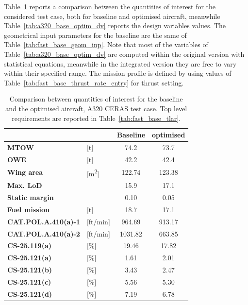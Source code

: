Table~\ref{tab:a320_base_optim_comparison} reports a comparison between the quantities of interest for the considered test case, both for baseline and optimised aircraft, meanwhile Table~\ref{tab:a320_base_optim_dv} reports the design variables values.
The geometrical input parameters for the baseline are the same of Table~\ref{tab:fast_base_geom_inp}.
Note that most of the variables of Table~\ref{tab:a320_base_optim_dv} are computed within the original version with statistical equations, meanwhile in the integrated version they are free to vary within their specified range.
The mission profile is defined by using values of Table~\ref{tab:fast_base_thrust_rate_entry} for thrust setting. 
\begin{table}[!h]
	\centering
	\begin{tabular}{l l c c}
		\hline
		& & \textbf{Baseline} & \textbf{optimised} \\
		\hline
		\textbf{MTOW} & [\si{\tonne}] & 74.2 & 73.7 \\
		\textbf{OWE} & [\si{\tonne}] & 42.2 & 42.4 \\
		\textbf{Wing area} & [\si{\square\meter}] & 122.74 & 123.38 \\
		\textbf{Max. LoD} & & 15.9 & 17.1 \\
		\textbf{Static margin} & & 0.10 & 0.05 \\
		\textbf{Fuel mission} & [\si{\tonne}] & 18.7 & 17.1 \\
		\hline
		\textbf{CAT.POL.A.410(a)-1} & [ft/min] & 964.69 & 913.17 \\
		\textbf{CAT.POL.A.410(a)-2} & [ft/min] & 1031.82 & 663.85 \\
		\textbf{CS-25.119(a)} & [\%] & 19.46 & 17.82 \\
		\textbf{CS-25.121(a)} & [\%] & 1.61 & 2.01 \\
		\textbf{CS-25.121(b)} & [\%] & 3.43 & 2.47 \\
		\textbf{CS-25.121(c)} & [\%] & 5.56 & 5.30 \\
		\textbf{CS-25.121(d)} & [\%] & 7.19 & 6.78 \\
		\hline
	\end{tabular}
	\caption{Comparison between quantities of interest for the baseline and the optimised aircraft, A320 CERAS test case. Top level requirements are reported in Table~\ref{tab:fast_base_tlar}.}
	\label{tab:a320_base_optim_comparison}
\end{table}

